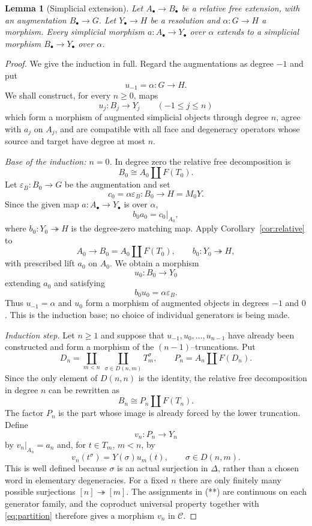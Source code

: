 \documentclass[11pt,a4paper]{article}
\newtheorem{lemma}[theorem]{Lemma}
\theoremstyle{definition}
\newcommand{\C}{\mathcal C}
\begin{document}
\begin{lemma}[Simplicial extension]\label{lem:extension}
Let $A_\bullet\to B_\bullet$ be a relative free extension, with an
augmentation $B_\bullet\to G$. Let $Y_\bullet\to H$ be a resolution
and $\alpha:G\to H$ a morphism. Every simplicial morphism
$a:A_\bullet\to Y_\bullet$ over $\alpha$ extends to a simplicial
morphism $B_\bullet\to Y_\bullet$ over $\alpha$.
\end{lemma}
\begin{proof}
We give the induction in full.  Regard the augmentations as degree
$-1$ and put
\[
 u_{-1}=\alpha:G\longrightarrow H.
\]
We shall construct, for every $n\geq0$, maps
\[
 u_j:B_j\longrightarrow Y_j\qquad(-1\leq j\leq n)
\]
which form a morphism of augmented simplicial objects through degree
$n$, agree with $a_j$ on $A_j$, and are compatible with all face and
degeneracy operators whose source and target have degree at most $n$.

\emph{Base of the induction: $n=0$.}
In degree zero the relative free decomposition is
\[
 B_0\cong A_0\amalg F(T_0).
\]
Let $\varepsilon_B:B_0\to G$ be the augmentation and set
\[
 c_0=\alpha\varepsilon_B:B_0\longrightarrow H=M_0Y.
\]
Since the given map $a:A_\bullet\to Y_\bullet$ is over $\alpha$,
\[
 b_0a_0=c_0|_{A_0},
\]
where $b_0:Y_0\twoheadrightarrow H$ is the degree-zero matching map.
Apply Corollary~\ref{cor:relative} to
\[
 A_0\longrightarrow B_0=A_0\amalg F(T_0),
 \qquad b_0:Y_0\twoheadrightarrow H,
\]
with prescribed lift $a_0$ on $A_0$.  We obtain a morphism
\[
 u_0:B_0\longrightarrow Y_0
\]
extending $a_0$ and satisfying
\[
 b_0u_0=\alpha\varepsilon_B.
\]
Thus $u_{-1}=\alpha$ and $u_0$ form a morphism of augmented objects in
degrees $-1$ and $0$.  This is the induction base; no choice of
individual generators is being made.

\emph{Induction step.}
Let $n\geq1$ and suppose that
$u_{-1},u_0,\ldots,u_{n-1}$ have already been constructed and form a
morphism of the $(n-1)$--truncations.  Put
\[
 D_n=
 \coprod_{m<n}\ \coprod_{\sigma\in D(n,m)}T_m^\sigma,
 \qquad
 P_n=A_n\amalg F(D_n).
\]
Since the only element of $D(n,n)$ is the identity, the relative free
decomposition in degree $n$ can be rewritten as
\[
 B_n\cong P_n\amalg F(T_n).                 \tag{*}
\]
The factor $P_n$ is the part whose image is already forced by the lower
truncation.  Define
\[
 v_n:P_n\longrightarrow Y_n
\]
by $v_n|_{A_n}=a_n$ and, for $t\in T_m$, $m<n$, by
\[
 v_n(t^\sigma)=Y(\sigma)u_m(t),
 \qquad \sigma\in D(n,m).                  \tag{**}
\]
This is well defined because $\sigma$ is an actual surjection in
$\Delta$, rather than a chosen word in elementary degeneracies.  For a
fixed $n$ there are only finitely many possible surjections
$[n]\twoheadrightarrow[m]$.  The assignments in (**) are continuous on
each generator family, and the coproduct universal property together
with \eqref{eq:partition} therefore gives a morphism $v_n$ in $\C$.


\end{proof}
\end{document}
